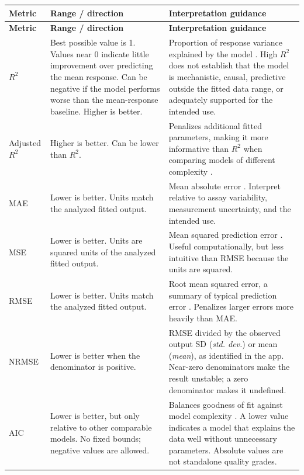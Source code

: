 \begin{longtable}{@{}>{\raggedright\arraybackslash}p{}>{\raggedright\arraybackslash}p{}>{\raggedright\arraybackslash}p{}@{}}
\toprule
\textbf{Metric} & \textbf{Range / direction} & \textbf{Interpretation guidance} \\
\midrule
\endfirsthead
\toprule
\textbf{Metric} & \textbf{Range / direction} & \textbf{Interpretation guidance} \\
\midrule
\endhead
    \(R^2\) & Best possible value is 1. Values near 0 indicate little improvement over predicting the mean response. Can be negative if the model performs worse than the mean-response baseline. Higher is better. & Proportion of response variance explained by the model \cite{miles2014}. High \(R^2\) does not establish that the model is mechanistic, causal, predictive outside the fitted data range, or adequately supported for the intended use. \\
    Adjusted \(R^2\) & Higher is better. Can be lower than \(R^2\). & Penalizes additional fitted parameters, making it more informative than \(R^2\) when comparing models of different complexity \cite{miles2014}. \\ 
    MAE & Lower is better. Units match the analyzed fitted output. & Mean absolute error \cite{hodson2022}. Interpret relative to assay variability, measurement uncertainty, and the intended use. \\
    MSE & Lower is better. Units are squared units of the analyzed fitted output. & Mean squared prediction error \cite{hodson2022}. Useful computationally, but less intuitive than RMSE because the units are squared. \\
    RMSE & Lower is better. Units match the analyzed fitted output. & Root mean squared error, a summary of typical prediction error \cite{hodson2022}. Penalizes larger errors more heavily than MAE. \\
    NRMSE & Lower is better when the denominator is positive. & RMSE divided by the observed output SD (\textit{std. dev.}) or mean (\textit{mean}), as identified in the app. Near-zero denominators make the result unstable; a zero denominator makes it undefined. \\
    AIC & Lower is better, but only relative to other comparable models. No fixed bounds; negative values are allowed. & Balances goodness of fit against model complexity \cite{akaike1974,burnham2002,wagenmakers2004}. A lower value indicates a model that explains the data well without unnecessary parameters. Absolute values are not standalone quality grades. \\

\end{longtable}
